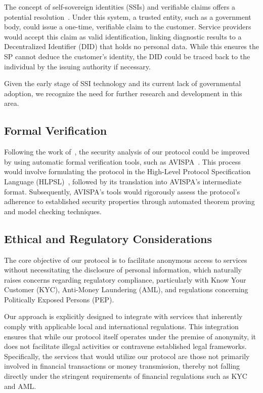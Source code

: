 \documentclass[pdftex,twocolumn,epjc3]{svjour3}
\begin{document}
The concept of self-sovereign identities (SSIs) and verifiable claims offers a potential resolution~\cite{muhleSurveyEssentialComponents2018}. Under this system, a trusted entity, such as a government body, could issue a one-time, verifiable claim to the customer. Service providers would accept this claim as valid identification, linking diagnostic results to a Decentralized Identifier (DID) that holds no personal data. While this ensures the SP cannot deduce the customer's identity, the DID could be traced back to the individual by the issuing authority if necessary.

Given the early stage of SSI technology and its current lack of governmental adoption, we recognize the need for further research and development in this area.

\subsection{Formal Verification}\label{sec:formal-verification}
Following the work of~\cite{birjoveanuFormalVerificationMultiparty2022}, the security analysis of our protocol could be improved by using automatic formal verification tools, such as AVISPA~\cite{armandoAVISPAToolAutomated2005}. This process would involve formulating the protocol in the High-Level Protocol Specification Language (HLPSL)~\cite{chevalierHighLevelProtocol2004}, followed by its translation into AVISPA's intermediate format. Subsequently, AVISPA's tools would rigorously assess the protocol's adherence to established security properties through automated theorem proving and model checking techniques.


\subsection{Ethical and Regulatory Considerations}

The core objective of our protocol is to facilitate anonymous access to services without necessitating the disclosure of personal information, which naturally raises concerns regarding regulatory compliance, particularly with Know Your Customer (KYC), Anti-Money Laundering (AML), and regulations concerning Politically Exposed Persons (PEP).

Our approach is explicitly designed to integrate with services that inherently comply with applicable local and international regulations. This integration ensures that while our protocol itself operates under the premise of anonymity, it does not facilitate illegal activities or contravene established legal frameworks. Specifically, the services that would utilize our protocol are those not primarily involved in financial transactions or money transmission, thereby not falling directly under the stringent requirements of financial regulations such as KYC and AML.
\end{document}
